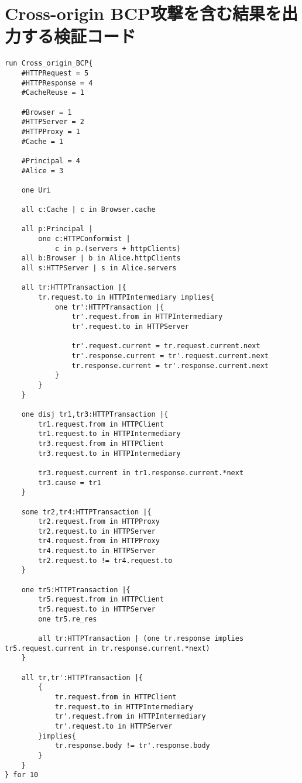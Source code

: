\documentclass[journal]{IEEEtran}
\begin{document}
\section{Cross-origin BCP攻撃を含む結果を出力する検証コード}

\begin{lstlisting}[caption=Cross-origin Browser Cache Poisoning攻撃の表現, label=code:Cross_origin_BCP]
run Cross_origin_BCP{
	#HTTPRequest = 5
	#HTTPResponse = 4
	#CacheReuse = 1

	#Browser = 1
	#HTTPServer = 2
	#HTTPProxy = 1
	#Cache = 1

	#Principal = 4
	#Alice = 3

	one Uri

	all c:Cache | c in Browser.cache

	all p:Principal |
		one c:HTTPConformist |
			c in p.(servers + httpClients)
	all b:Browser | b in Alice.httpClients
	all s:HTTPServer | s in Alice.servers

	all tr:HTTPTransaction |{
		tr.request.to in HTTPIntermediary implies{
			one tr':HTTPTransaction |{
				tr'.request.from in HTTPIntermediary
				tr'.request.to in HTTPServer

				tr'.request.current = tr.request.current.next
				tr'.response.current = tr'.request.current.next
				tr.response.current = tr'.response.current.next
			}
		}
	}
	
	one disj tr1,tr3:HTTPTransaction |{
		tr1.request.from in HTTPClient
		tr1.request.to in HTTPIntermediary
		tr3.request.from in HTTPClient
		tr3.request.to in HTTPIntermediary

		tr3.request.current in tr1.response.current.*next
		tr3.cause = tr1
	}

	some tr2,tr4:HTTPTransaction |{
		tr2.request.from in HTTPProxy
		tr2.request.to in HTTPServer
		tr4.request.from in HTTPProxy
		tr4.request.to in HTTPServer
		tr2.request.to != tr4.request.to
	}

	one tr5:HTTPTransaction |{
		tr5.request.from in HTTPClient
		tr5.request.to in HTTPServer
		one tr5.re_res

		all tr:HTTPTransaction | (one tr.response implies tr5.request.current in tr.response.current.*next)
	}

	all tr,tr':HTTPTransaction |{
		{
			tr.request.from in HTTPClient
			tr.request.to in HTTPIntermediary
			tr'.request.from in HTTPIntermediary
			tr'.request.to in HTTPServer
		}implies{
			tr.response.body != tr'.response.body
		}
	}
} for 10
\end{lstlisting}
\end{document}
